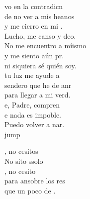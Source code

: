 \begin{cancion}[Un poco de fe][Ixcís]
	vo en la contradicn\\
	de no ver a mis heanos\\
	y me cierro en mi .\\
	Lucho, me canso y deo.\\
	No me encuentro a míismo\\
	y me siento aún pr.\\
ni siquiera sé quién soy.\\
	tu luz me ayude a\\
	 sendero que he de anr\\
	para llegar a mi verd.\\
	e, Padre, compren\\
	e nada es impoble.\\
	Puedo volver a nar.\\jump\\
	\begin{chorus}%
	, no cesitos\\
	No sito ssolo  \\
	, no cesito \\
	para ansobre los res\\
	que un poco de .\\
	\end{chorus}%
	\jump\\
\end{cancion}%
